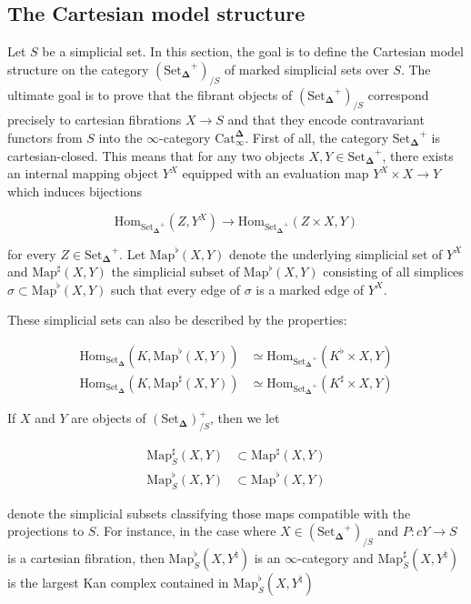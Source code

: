 \documentclass[12pt]{amsart}
\newcommand{\8}{\ensuremath{\infty}}
\newcommand{\SSet}{\ensuremath{\text{Set}_{\boldsymbol{\Delta}}}}
\newcommand{\Catinfdel}{\ensuremath{\text{Cat}^{\boldsymbol{\Delta}}_{\infty}}}
\newcommand{\Map}{\ensuremath{\text{Map}}}
\newcommand{\Hom}{\ensuremath{\text{Hom}}}
\begin{document}
{{\subsection{The Cartesian model structure}
Let $S$ be a simplicial set. In this section, the goal is to define the Cartesian model structure on the category $(\SSet^+)_{/S}$ of marked simplicial sets over $S$. The ultimate goal is to prove that the fibrant objects of $(\SSet^+)_{/S}$ correspond precisely to cartesian fibrations $X \rightarrow S$ and that they encode contravariant functors from $S$ into the \8-category \Catinfdel.
First of all, the category $\SSet^+$ is cartesian-closed. This means that for any two objects $X, Y\in \SSet^+$, there exists an internal mapping object $Y^X$ equipped with an evaluation map $Y^X\times X \rightarrow Y$ which induces bijections

$$
  \Hom_{\SSet^+}(Z, Y^X) \rightarrow \Hom_{\SSet^+}(Z\times X, Y)
$$

for every $Z \in \SSet^+$. Let $\Map^\flat(X, Y)$ denote the underlying simplicial set of $Y^X$ and $\Map^\sharp(X, Y)$ the simplicial subset of $\Map^\flat(X, Y)$ consisting of all simplices $\sigma\subset \Map^\flat(X, Y)$ such that every edge of $\sigma$ is a marked edge of $Y^X$.

These simplicial sets can also be described by the properties:

\begin{align*}
  \Hom_{\SSet}(K, \Map^\flat(X, Y))  & \simeq \Hom_{\SSet^+}(K^\flat\times X, Y)  \\
  \Hom_{\SSet}(K, \Map^\sharp(X, Y)) & \simeq \Hom_{\SSet^+}(K^\sharp\times X, Y)
\end{align*}

If $X$ and $Y$ are objects of $(\SSet)^+_{/S}$, then we let

\begin{align*}
  \Map_S^\sharp(X, Y) & \subset \Map^\sharp(X, Y) \\
  \Map_S^\flat(X, Y)  & \subset \Map^\flat(X, Y)
\end{align*}

denote the simplicial subsets classifying those maps compatible with the projections to $S$. For instance, in the case where $X \in (\SSet^+)_{/S}$ and $P: c Y \rightarrow S$ is a cartesian fibration, then $\Map^\flat_S(X, Y^\natural)$ is an \8-category and $\Map^\sharp_S(X, Y^\natural)$ is the largest Kan complex contained in $\Map^\flat_S(X, Y^\natural)$

}}
\end{document}
